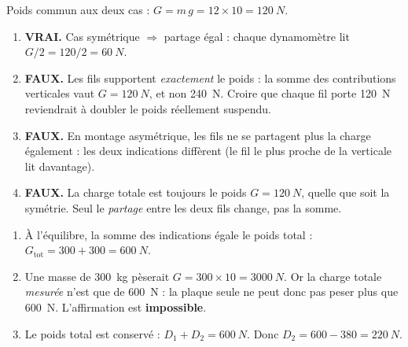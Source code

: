 \documentclass[11pt,a4paper]{article}
\begin{document}
\begin{corrige}
Poids commun aux deux cas : $G = m\,g = 12\times 10 = \qty{120}{N}$.
\begin{enumerate}[label=\alph*)]
  \item \textbf{VRAI.} Cas symétrique $\Rightarrow$ partage égal : chaque dynamomètre lit
        $G/2 = 120/2 = \qty{60}{N}$.
  \item \textbf{FAUX.} Les fils supportent \emph{exactement} le poids : la somme des contributions
        verticales vaut $G=\qty{120}{N}$, et non \qty{240}{N}. Croire que chaque fil porte
        \qty{120}{N} reviendrait à doubler le poids réellement suspendu.
  \item \textbf{FAUX.} En montage asymétrique, les fils ne se partagent plus la charge également :
        les deux indications diffèrent (le fil le plus proche de la verticale lit davantage).
  \item \textbf{FAUX.} La charge totale est toujours le poids $G=\qty{120}{N}$, quelle que soit la
        symétrie. Seul le \emph{partage} entre les deux fils change, pas la somme.
\end{enumerate}
\end{corrige}

\begin{corrige}
\begin{enumerate}[label=\alph*)]
  \item À l'équilibre, la somme des indications égale le poids total :
        $G_{\text{tot}} = 300 + 300 = \qty{600}{N}$.
  \item Une masse de \qty{300}{kg} pèserait $G = 300\times 10 = \qty{3000}{N}$. Or la charge totale
        \emph{mesurée} n'est que de \qty{600}{N} : la plaque seule ne peut donc pas peser plus que
        \qty{600}{N}. L'affirmation est \textbf{impossible}.
  \item Le poids total est conservé : $D_1+D_2 = \qty{600}{N}$. Donc
        $D_2 = 600 - 380 = \qty{220}{N}$.
\end{enumerate}
\end{corrige}
\end{document}
